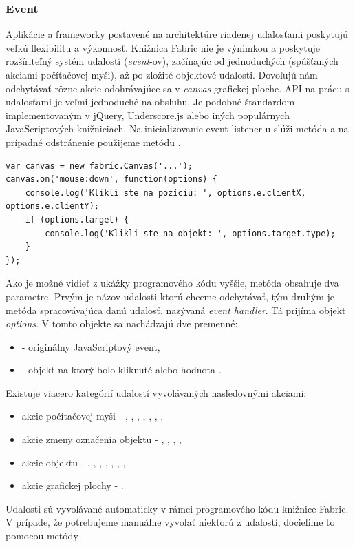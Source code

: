 \subsubsection{Event}

Aplikácie a frameworky postavené na architektúre riadenej udalosťami poskytujú veľkú flexibilitu a výkonnosť. Knižnica Fabric nie je výnimkou a poskytuje rozšíriteľný systém udalostí (\textit{event}-ov), začínajúc od jednoduchých (spúšťaných akciami počítačovej myši), až po zložité objektové udalosti. Dovoľujú nám odchytávať rôzne akcie odohrávajúce sa v \textit{canvas} grafickej ploche. API na prácu s udalosťami je veľmi jednoduché na obsluhu. Je podobné štandardom implementovaným v jQuery, Underscore.js alebo iných populárnych JavaScriptových knižniciach. Na inicializovanie event listener-u slúži metóda  a na prípadné odstránenie použijeme metódu .
\begin{lstlisting}[style=web,caption={Ukážka programovej implementácie na prácu s eventami},captionpos=b, label={lst:fabric-events}]
var canvas = new fabric.Canvas('...');
canvas.on('mouse:down', function(options) {
	console.log('Klikli ste na pozíciu: ', options.e.clientX, options.e.clientY);
	if (options.target) {
		console.log('Klikli ste na objekt: ', options.target.type);
	}
});
\end{lstlisting}
Ako je možné vidieť z ukážky programového kódu vyššie, metóda  obsahuje dva parametre. Prvým je názov udalosti ktorú chceme odchytávať, tým druhým je metóda spracovávajúca danú udalosť, nazývaná \textit{event handler}. Tá prijíma objekt \textit{options}. V tomto objekte sa nachádzajú dve premenné:
\begin{itemize}
	\item {} - originálny JavaScriptový event,
	\item {} - objekt na ktorý bolo kliknuté alebo hodnota .
\end{itemize}
Existuje viacero kategórií udalostí vyvolávaných nasledovnými akciami:
\begin{itemize}
	\item akcie počítačovej myši - , , , , , , ,
	\item akcie zmeny označenia objektu - , , , ,
	\item akcie objektu - , , , , , , ,
	\item akcie grafickej plochy - .
\end{itemize}
Udalosti sú vyvolávané automaticky v rámci programového kódu knižnice Fabric. V prípade, že potrebujeme manuálne vyvolať niektorú z udalostí, docielime to pomocou metódy  

